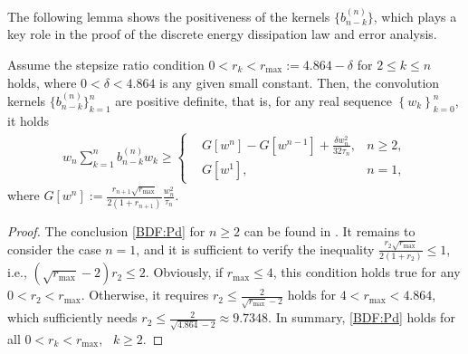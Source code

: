 \documentclass{m2an}
\begin{document}
The following lemma shows the positiveness of the kernels $ \{b^{(n)}_{n-k}\} $, which plays a key role in the proof of the discrete energy dissipation law and error analysis.
\begin{lmm}\label{lem:BDF2_P1} 
	Assume the stepsize ratio condition $ 0 < r_k < r_{\max} := 4.864 - \delta$ for $2 \leq k \leq n$ holds, where $ 0< \delta < 4.864$ is any given small constant. Then, the convolution kernels $\{  b^{(n)}_{n-k} \}_{k=1}^{n}$ are positive definite, that is, for any real sequence $\left\{w_k\right\}_{k=0}^n$, it holds
	\begin{equation}\label{BDF:Pd}
		\begin{array}{l}
			w_n \sum\limits_{k=1}^n b_{n-k}^{(n)} w_k \geq 
			\left\{
			\begin{aligned}
				& G[ w^n ] - G[ w^{n-1} ] + \frac{\delta w_n^2}{32 \tau_n}, & n \geq 2 ,\\
				& G[ w^{1} ],  &  n = 1, 
			\end{aligned}
			\right.
		\end{array}
	\end{equation}
	where $ G[ w^n ] := \frac{r_{n+1} \sqrt{r_{\max }}}{2\left(1+r_{n+1}\right)} \frac{w_n^2}{\tau_n} $.
\end{lmm}
\begin{proof}
	The conclusion \eqref{BDF:Pd} for $ n \geq 2 $ can be found in \cite[Lemma 3.1]{JSC_Zhang_2022}. It remains to consider the case $ n = 1 $, %
	and it is sufficient to verify the inequality $ \frac{r_{2} \sqrt{r_{\max }}}{2\left(1+r_{2}\right)} \leq 1 $, i.e., $ ( \sqrt{ r_{\max} } - 2 ) r_{2} \leq 2 $. Obviously, if $ r_{\max} \leq 4 $, this condition holds true for any $ 0 < r_{2} < r_{\max} $. Otherwise, it requires $ r_{2} \leq \frac{ 2 }{ \sqrt{ r_{\max} } - 2 } $ holds for $ 4 < r_{\max} < 4.864 $, which sufficiently needs $ r_{2} \leq \frac{ 2 }{ \sqrt{ 4.864 } - 2 } \approx 9.7348 $. In summary, \eqref{BDF:Pd} holds for all  $ 0 < r_k < r_{\max}$, ~$k \ge 2$.
\end{proof}
\end{document}
